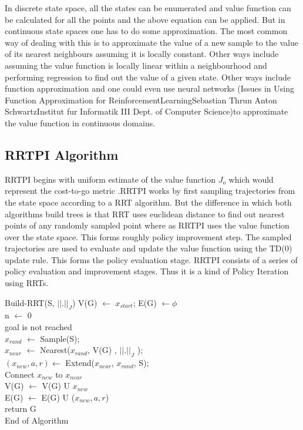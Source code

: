 \documentclass[MTech]{iitmdiss}
\begin{document}
In discrete state space, all the states can be enumerated and value function can be calculated for all the points and the above equation can be applied. But in continuous state spaces one has to do some approximation. The most common way of dealing with this is to approximate the value of a new sample to the value of its nearest neighbours assuming it is locally constant. Other ways include assuming the value function is locally linear within a neighbourhood and performing regression to find out the value of a given state. Other ways include function approximation and one could even use neural networks (Issues in Using Function Approximation for ReinforcementLearningSebastian Thrun Anton SchwartzInstitut fur Informatik III Dept. of Computer Science)to approximate the value function in continuous domains.

\subsection{RRTPI Algorithm}

RRTPI begins with uniform estimate of the value function $J_o$ which would represent the cost-to-go metric .RRTPI works by first sampling trajectories from the state space according to a RRT algorithm. But the difference in which both algorithms build trees is that RRT uses euclidean distance to find out nearest points of any randomly sampled point where as RRTPI uses the value function over the state space. This forms roughly policy improvement step. The sampled trajectories are used to evaluate and update the value function using the TD(0) update rule. This forms the policy evaluation stage. RRTPI consists of a series of policy evaluation and improvement stages. Thus it is a kind of Policy Iteration using RRTs. 

\begin{algorithm}{Build-RRT(S, $|| . ||_J$)}{
\label{algo:Build-RRT}
}
 V(G) $\leftarrow$ {$x_{start}$};  E(G) $\leftarrow${$\phi$ } \\
 n $\leftarrow$ 0\\
\qwhile goal is not reached \\
$x_{rand}$ $\leftarrow$ Sample(S);\\
$x_{near}$ $\leftarrow$ Nearest($x_{rand}$, V(G) , $|| . ||_J $ );\\
$(x_{new}, a, r) \leftarrow$ Extend($x_{near}$, $x_{rand}$, S);\\
Connect $x_{new}$ to $x_{near}$\\
V(G) $\leftarrow$ V(G) U {$ x_{new}$ }\\
E(G) $\leftarrow$ E(G) U ($x_{new}, a, r$)\qend\\
return G\\
End of Algorithm
\end{algorithm}
\end{document}
